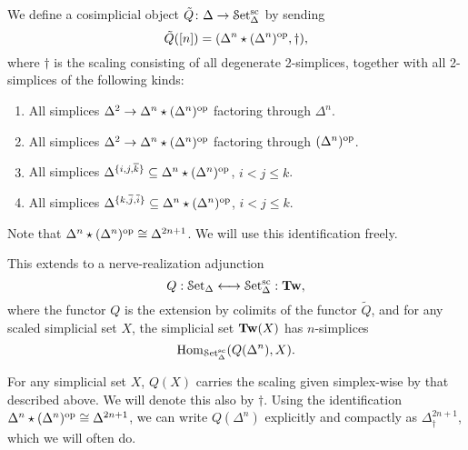 \documentclass[main.tex]{subfiles}
\begin{document}
\begin{definition}
  We define a cosimplicial object $\tilde{Q}\colon \Delta \to \mathcal{S}\mathrm{et}_{\Delta}^{\mathrm{sc}}$ by sending
  \begin{equation*}
    \tilde{Q}([n]) = (\Delta^{n} \star (\Delta^{n})^{\mathrm{op}}, \dagger),
  \end{equation*}
  where $\dagger$ is the scaling consisting of all degenerate 2-simplices, together with all 2-simplices of the following kinds:
  \begin{enumerate}
    \item All simplices $\Delta^{2} \to \Delta^{n} \star (\Delta^{n})^{\mathrm{op}}$ factoring through $\Delta^{n}$.

    \item All simplices $\Delta^{2} \to \Delta^{n} \star (\Delta^{n})^{\mathrm{op}}$ factoring through $(\Delta^{n})^{\mathrm{op}}$.

    \item All simplices $\Delta^{\{i, j, \overline{k}\}} \subseteq \Delta^{n} \star (\Delta^{n})^{\mathrm{op}}$, $i < j \leq k$.

    \item All simplices $\Delta^{\{k, \overline{j}, \overline{i}\}} \subseteq \Delta^{n} \star (\Delta^{n})^{\mathrm{op}}$, $i < j \leq k$.
  \end{enumerate}
\end{definition}

Note that $\Delta^{n} \star (\Delta^{n})^{\mathrm{op}} \cong \Delta^{2n+1}$. We will use this identification freely.

This extends to a nerve-realization adjunction
\begin{equation*}
  Q : \mathcal{S}\mathrm{et}_{\Delta} \longleftrightarrow \mathcal{S}\mathrm{et}_{\Delta}^{\mathrm{sc}} : \mathbf{Tw},
\end{equation*}
where the functor $Q$ is the extension by colimits of the functor $\tilde{Q}$, and for any scaled simplicial set $X$, the simplicial set $\mathbf{Tw}(X)$ has $n$-simplices
\begin{equation*}
  \mathrm{Hom}_{\mathcal{S}\mathrm{et}_{\Delta}^{\mathrm{sc}}}(Q(\Delta^{n}), X).
\end{equation*}

\begin{notation}
  For any simplicial set $X$, $Q(X)$ carries the scaling given simplex-wise by that described above. We will denote this also by $\dagger$. Using the identification $\Delta^{n} \star (\Delta^{n})^{\mathrm{op}} \cong \Delta^{2n+1}$, we can write $Q(\Delta^{n})$ explicitly and compactly as $\Delta^{2n+1}_{\dagger}$, which we will often do.
\end{notation}
\end{document}
